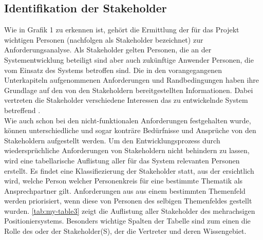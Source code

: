 \documentclass[../../../Bachelorarbeit.tex]{subfiles}
\begin{document}
\clearpage
\subsection{Identifikation der Stakeholder} \label{stakeholder}
Wie in Grafik 1 zu erkennen ist, gehört die Ermittlung der für das Projekt wichtigen Personen (nachfolgen als Stakeholder bezeichnet) zur Anforderungsanalyse. Als Stakeholder gelten Personen, die an der Systementwicklung beteiligt sind aber auch zukünftige Anwender \bzw Personen, die vom Einsatz des Systems betroffen sind. Die in den vorangegangenen Unterkapiteln aufgenommenen Anforderungen und Randbedingungen haben ihre Grundlage auf den von den Stakeholdern bereitgestellten Informationen. Dabei vertreten die Stakeholder verschiedene Interessen das zu entwickelnde System betreffend \cite[56]{Kleuker2013}.\\
Wie auch schon bei den nicht-funktionalen Anforderungen festgehalten wurde, können unterschiedliche und sogar konträre Bedürfnisse und Ansprüche von den Stakeholdern aufgestellt werden. Um den Entwicklungsprozess durch wiedersprüchliche Anforderungen von Stakeholdern nicht behindern zu lassen, wird eine tabellarische Auflistung aller für das System relevanten Personen erstellt. Es findet eine Klassifiezierung der Stakeholder statt, aus der ersichtlich wird, welche Person \bzw welcher Personenkreis für eine bestimmte Thematik als Ansprechpartner gilt. Anforderungen aus aus einem bestimmten Themenfeld werden priorisiert, wenn diese von Personen des selbigen Themenfeldes gestellt wurden. \autoref{tab:my-table3} zeigt die Auflistung aller Stakeholder des mehrachsigen Positioniersystems. Besonders wichtige Spalten der Tabelle sind zum einen die Rolle des oder der Stakeholder(S), der \bzw die Vertreter und deren Wissengebiet.\\
\end{document}
